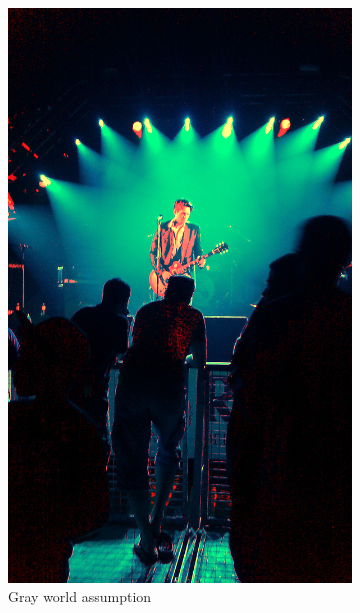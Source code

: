 \documentclass[a4paper]{article}
\begin{document}
\begin{figure}[H]
	\vspace{3mm}
	\begin{subfigure}[h]{0.48\textwidth}
		\centering
		\includegraphics[width=\textwidth]{concert_gray-world}
		\caption*{Gray world assumption}
	\end{subfigure}
	~
	\begin{subfigure}[h]{0.48\textwidth}
		\centering

\end{subfigure}
\end{figure}
\end{document}
